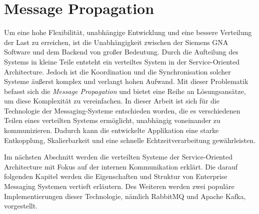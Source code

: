 \chapter{Message Propagation}
\label{chp:message_propagation}

Um eine hohe Flexibilität, unabhängige Entwicklung und eine bessere Verteilung der Last zu erreichen, ist die Unabhängigkeit zwischen der Siemens GNA Software und dem Backend von großer Bedeutung.
Durch die Aufteilung des Systems in kleine Teile entsteht ein verteiltes System in der Service-Oriented Architecture. Jedoch ist die Koordination und die Synchronisation solcher Systeme äußerst komplex und verlangt hohen Aufwand. Mit dieser Problematik befasst sich die \emph{Message Propagation} und bietet eine Reihe an Lösungsansätze, um diese Komplexität zu vereinfachen. In dieser Arbeit ist sich für die Technologie der Messaging-Systeme entschieden worden, die es verschiedenen Teilen eines verteilten Systems ermöglicht, unabhängig voneinander zu kommunizieren. Dadurch kann die entwickelte Applikation eine starke Entkopplung, Skalierbarkeit und eine schnelle Echtzeitverarbeitung gewährleisten.

Im nächsten Abschnitt werden die verteilten Systeme der Service-Oriented Architecture mit Fokus auf der internen Kommunikation erklärt. Die darauf folgenden Kapitel werden die Eigenschaften und Struktur von Enterprise Messaging Systemen vertieft erläutern. Des Weiteren werden zwei populäre Implementierungen dieser Technologie, nämlich RabbitMQ und Apache Kafka, vorgestellt.




